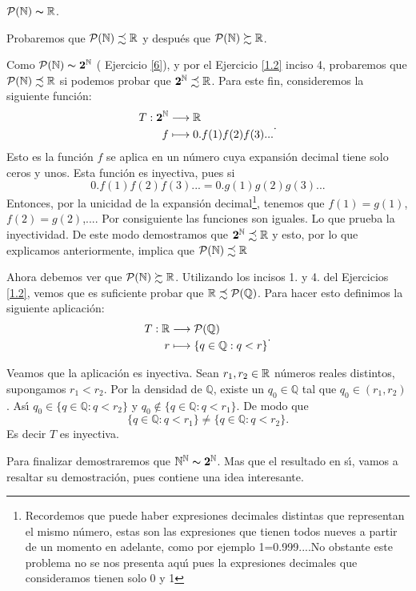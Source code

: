 \begin{teorema} $\mathcal{P}(\nn)\thicksim\rr$.
\end{teorema}
\begin{demo} Probaremos que $\mathcal{P}(\nn)\precsim\rr$ y despu\'es que
$\mathcal{P}(\nn)\succsim\rr$.

 Como $\mathcal{P}(\nn)\thicksim\mathbf{2}^{\nn}$ ( Ejercicio \vref{6}), y por el
 Ejercicio \vref{1.2} inciso 4, probaremos que $\mathcal{P}(\nn)\precsim\rr$ si podemos
 probar que $\mathbf{2}^{\nn}\precsim \rr$. Para este fin,
 consideremos la siguiente funci\'on:
 \[
    \begin{split}
          T:\mathbf{2}^{\nn}&\longrightarrow \rr\\
           f&\longmapsto 0.f(1)f(2)f(3)...\\
    \end{split}
 .\]
Esto es la funci\'on $f$ se aplica en un n\'umero cuya expansi\'on
decimal tiene solo ceros y unos. Esta funci\'on es inyectiva, pues
si
\[0.f(1)f(2)f(3)...=0.g(1)g(2)g(3)...\]
Entonces, por la unicidad de la expansi\'on
decimal\footnote{Recordemos que puede haber expresiones decimales
distintas que representan el mismo n\'umero, estas son las
expresiones que tienen todos nueves a partir de un momento en
adelante, como por ejemplo 1=0.999....No obstante este problema no
se nos presenta aqu\'{\i} pues la expresiones decimales que
consideramos tienen solo 0 y 1}, tenemos que $f(1)=g (1)$,
$f(2)=g(2)$,.... Por consiguiente las funciones son iguales. Lo
que prueba la inyectividad. De este modo demostramos que
$\mathbf{2}^{\nn}\precsim \rr$ y esto, por lo que explicamos
anteriormente, implica que $\mathcal{P}(\nn)\precsim \rr$

Ahora debemos ver que $\mathcal{P}(\nn)\succsim\rr$. Utilizando
los  incisos 1. y 4. del Ejercicios \vref{1.2}, vemos que es
suficiente probar que $\rr\precsim \mathcal{P}(\mathbb{Q})$. Para
hacer esto definimos la siguiente aplicaci\'on:
\[
   \begin{split}
        T:\rr &\longrightarrow \mathcal{P}(\mathbb{Q})\\
        r &\longmapsto \{q\in\mathbb{Q}:q<r\}
   \end{split}
.\]

Veamos que  la aplicaci\'on es inyectiva. Sean $r_1,r_2\in\rr$
n\'umeros reales distintos, supongamos $r_1<r_2$. Por la densidad
de $\mathbb{Q}$, existe un $q_0\in\mathbb{Q}$ tal que
$q_0\in(r_1,r_2)$. As\'{\i} $q_0\in\{q\in\mathbb{Q}:q<r_2\}$ y
$q_0\notin\{q\in\mathbb{Q}:q<r_1\}$. De modo que
\[\{q\in\mathbb{Q}:q<r_1\}\neq\{q\in\mathbb{Q}:q<r_2\}.\]
Es decir $T$ es inyectiva.
\end{demo}
Para finalizar demostraremos que
$\nn^{\nn}\thicksim\mathbf{2}^{\nn}$. Mas que el resultado en
s\'{\i}, vamos a resaltar su demostraci\'on, pues contiene una
idea interesante.

